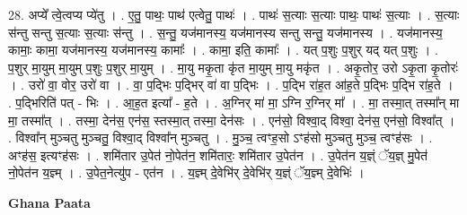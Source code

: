 \documentclass[17pt]{extarticle}
\begin{document}
28. अप्ये᳚ त्वे॒त्वप्य प्ये॑तु । . ए॒तु॒ पाथः॒ पाथ॑ एत्वेतु॒ पाथः॑ । . पाथः॑ स॒त्याः स॒त्याः पाथः॒ पाथः॑ स॒त्याः । . स॒त्याः स॑न्तु सन्तु स॒त्याः स॒त्याः स॑न्तु । . स॒न्तु॒ यज॑मानस्य॒ यज॑मानस्य सन्तु सन्तु॒ यज॑मानस्य । . यज॑मानस्य॒ कामाः॒ कामा॒ यज॑मानस्य॒ यज॑मानस्य॒ कामाः᳚ । . कामा॒ इति॒ कामाः᳚ । . यत् प॒शुः प॒शुर् यद् यत् प॒शुः । . प॒शुर् मा॒युम् मा॒युम् प॒शुः प॒शुर् मा॒युम् । . मा॒यु मकृ॒ता कृ॑त मा॒युम् मा॒यु मकृ॑त । . अकृ॒तोर॒ उरो ऽकृ॒ता कृ॒तोरः॑ । . उरो॑ वा॒ वोर॒ उरो॑ वा । . वा॒ प॒द्भिः प॒द्भिर् वा॑ वा प॒द्भिः । . प॒द्भि रा॑ह॒त आ॑ह॒ते प॒द्भिः प॒द्भि रा॑ह॒ते । . प॒द्भिरिति॑ पत् - भिः । . आ॒ह॒त इत्या᳚ - ह॒ते । . अ॒ग्निर् मा॑ मा॒ ऽग्नि र॒ग्निर् मा᳚ । . मा॒ तस्मा॒त् तस्मा᳚न् मा मा॒ तस्मा᳚त् । . तस्मा॒ देन॑स॒ एन॑स॒ स्तस्मा॒त् तस्मा॒ देन॑सः । . एन॑सो॒ विश्वा॒द् विश्वा॒ देन॑स॒ एन॑सो॒ विश्वा᳚त् । . विश्वा᳚न् मुञ्चतु मुञ्चतु॒ विश्वा॒द् विश्वा᳚न् मुञ्चतु । . मु॒ञ्च॒ त्वꣳह॒सो ऽꣳह॑सो मुञ्चतु मुञ्च॒ त्वꣳह॑सः । . अꣳह॑स॒ इत्यꣳह॑सः । . शमि॑तार उ॒पेत॑ नो॒पेत॑न॒ शमि॑तारः॒ शमि॑तार उ॒पेत॑न । . उ॒पेत॑न य॒ज्ञ्ं ॅय॒ज्ञ् मु॒पेत॑ नो॒पेत॑न य॒ज्ञ्म् । . उ॒पेत॒नेत्यु॑प - एत॑न । . य॒ज्ञ्म् दे॒वेभि॑र् दे॒वेभि॑र् य॒ज्ञ्ं ॅय॒ज्ञ्म् दे॒वेभिः॑ । \newline

\textbf{Ghana Paata } \newline
\end{document}
